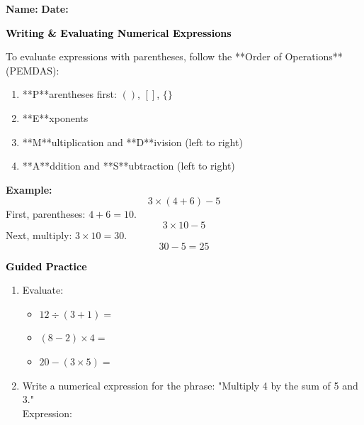 \documentclass[12pt, letterpaper, fleqn]{article}
\newcommand{\blank}{\underline{\hspace{2.2cm}}}
\newcommand{\blanklong}{\underline{\hspace{6.5cm}}}
\begin{document}
\textbf{Name:} \underline{\hspace{5cm}}
\hfill
\textbf{Date:} \underline{\hspace{3cm}}\\

\begin{tcolorbox}[colback=customteal!20]
    \large\textcolor{black}{\textbf{Writing & Evaluating Numerical Expressions}}
\end{tcolorbox}

\vspace{3mm}
\noindent
To evaluate expressions with parentheses, follow the **Order of Operations** (PEMDAS):
\begin{enumerate}
    \item **P**arentheses first: $()$, $[]$, $\{\}$
    \item **E**xponents
    \item **M**ultiplication and **D**ivision (left to right)
    \item **A**ddition and **S**ubtraction (left to right)
\end{enumerate}

\vspace{3mm}
\begin{tcolorbox}[colback=white, colframe=black!25, boxrule=0.6pt, arc=4mm]
\textbf{Example:}
\[
3 \times (4 + 6) - 5
\]
First, parentheses: $4 + 6 = 10$.
\[
3 \times 10 - 5
\]
Next, multiply: $3 \times 10 = 30$.
\[
30 - 5 = 25
\]
\end{tcolorbox}

\newpage
\begin{tcolorbox}[colback=customteal!20]
    \large\textcolor{black}{\textbf{Guided Practice}}
\end{tcolorbox}

\vspace{5mm}
\begin{enumerate}[itemsep=2.5cm, leftmargin=0.6cm]
\item Evaluate:
  \begin{itemize}[itemsep=0.8cm]
    \item $12 \div (3 + 1) =$ \blank
    \item $(8 - 2) \times 4 =$ \blank
    \item $20 - (3 \times 5) =$ \blank
  \end{itemize}

\item Write a numerical expression for the phrase: "Multiply 4 by the sum of 5 and 3."
\\
Expression: \blanklong
\end{enumerate}
\end{document}
